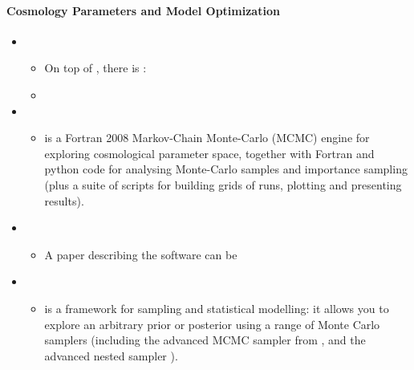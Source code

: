 \documentclass[letterpaper,10pt,english]{sphinxmanual}
\begin{document}
\paragraph{Cosmology Parameters and Model Optimization}
\label{\detokenize{resource/astro/topics/cosmology_tools:cosmology-parameters-and-model-optimization}}\begin{itemize}
\item {} 
\begin{itemize}
\item {} 
On top of , there is :

\item {} 

\end{itemize}

\item {} 
\begin{itemize}
\item {} 
 is a Fortran 2008 Markov-Chain Monte-Carlo (MCMC)
engine for exploring cosmological parameter space, together with
Fortran and python code for analysing Monte-Carlo samples and
importance sampling (plus a suite of scripts for building grids of
runs, plotting and presenting results).

\end{itemize}

\item {} 
\begin{itemize}
\item {} 
A paper describing the software can be 

\end{itemize}

\item {} 
\begin{itemize}
\item {} 
 is a framework for sampling and statistical modelling:
it allows you to explore an arbitrary prior or posterior using a
range of Monte Carlo samplers (including the advanced MCMC sampler
from , and the advanced nested sampler ).


\end{itemize}
\end{itemize}
\end{document}
